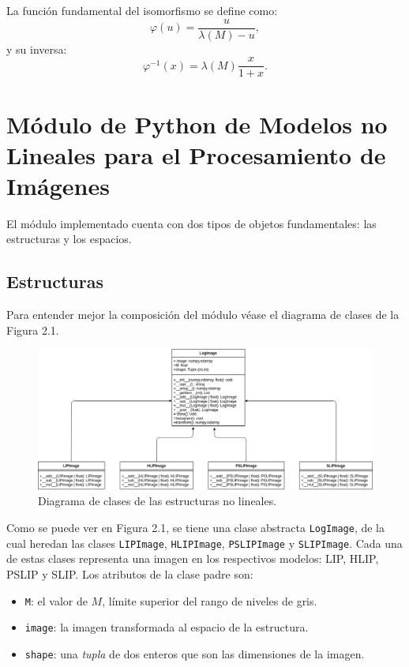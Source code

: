 La funci\'on fundamental del isomorfismo se define como:
\begin{equation}
	\varphi(u)=\frac{u}{\lambda(M)-u},
\end{equation}
y su inversa:
\begin{equation}
	\varphi^{-1}(x)=\lambda(M)\frac{x}{1+x}.
\end{equation}

\section{M\'odulo de Python de Modelos no Lineales para el Procesamiento de Im\'agenes}

El m\'odulo implementado cuenta con dos tipos de objetos fundamentales: las estructuras y los espacios.

\subsection{Estructuras}

Para entender mejor la composici\'on del m\'odulo v\'ease el diagrama de clases de la Figura 2.1.

\begin{figure}[h]
	\begin{center}
		\includegraphics[width=16.0 cm]{images/structures_class_diagram.png}
		\caption{Diagrama de clases de las estructuras no lineales.}
	\end{center}
\end{figure}

Como se puede ver en Figura 2.1, se tiene una clase abstracta \verb|LogImage|, de la cual heredan las clases \verb|LIPImage|, \verb|HLIPImage|, \verb|PSLIPImage| y \verb|SLIPImage|. Cada una de estas clases representa una imagen en los respectivos modelos: LIP, HLIP, PSLIP y SLIP. Los atributos de la clase padre son:

\begin{itemize}
	\item \verb|M|: el valor de $M$, l\'imite superior del rango de niveles de gris.
	\item \verb|image|: la imagen transformada al espacio de la estructura.
	\item \verb|shape|: una \textit{tupla} de dos enteros que son las dimensiones de la imagen.
\end{itemize}


